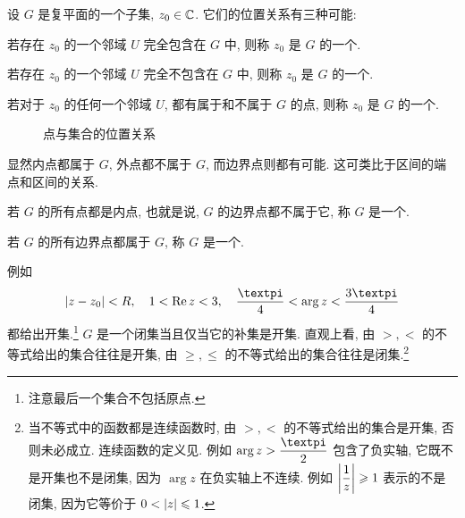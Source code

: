 设 $G$ 是复平面的一个子集, $z_0\in{\mathbb{C}}$.
它们的位置关系有三种可能:
\begin{enuma}
  \item 若存在 $z_0$ 的一个邻域 $U$ 完全包含在 $G$ 中, 则称 $z_0$ 是 $G$ 的一个.
  \item 若存在 $z_0$ 的一个邻域 $U$ 完全不包含在 $G$ 中, 则称 $z_0$ 是 $G$ 的一个.
  \item 若对于 $z_0$ 的任何一个邻域 $U$, 都有属于和不属于 $G$ 的点, 则称 $z_0$ 是 $G$ 的一个.
\end{enuma}

\begin{figure}[H]
  \centering
  \caption{点与集合的位置关系}
\end{figure}

显然内点都属于 $G$, 外点都不属于 $G$, 而边界点则都有可能.
这可类比于区间的端点和区间的关系.

\begin{definition}
  \begin{enuma}
    \item 若 $G$ 的所有点都是内点, 也就是说, $G$ 的边界点都不属于它, 称 $G$ 是一个.
    \item 若 $G$ 的所有边界点都属于 $G$, 称 $G$ 是一个.
  \end{enuma}
\end{definition}

例如
\[
  \abs{z-z_0}<R,\quad 1<\Re z<3,\quad\frac\cpi4<\arg z<\frac{3\cpi}4
\]
都给出开集.\footnote{
  注意最后一个集合不包括原点.
}
$G$ 是一个闭集当且仅当它的补集是开集.
直观上看, 由 $>,<$ 的不等式给出的集合往往是开集, 由 $\ge,\le$ 的不等式给出的集合往往是闭集.\footnote{%
  当不等式中的函数都是连续函数时, 由 $>,<$ 的不等式给出的集合是开集, 否则未必成立.
  连续函数的定义见.
  例如 $\arg z>\dfrac\cpi2$ 包含了负实轴, 它既不是开集也不是闭集, 因为 $\arg z$ 在负实轴上不连续.
  例如 $\biggl\vert\dfrac1z\biggr\vert\geqslant 1$ 表示的不是闭集, 因为它等价于 $0<\lvert z\rvert\leqslant1$.
}

